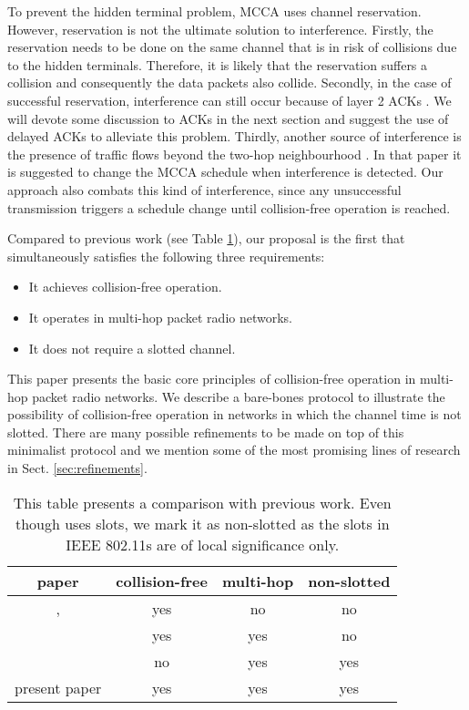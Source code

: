 \documentclass[twocolumn]{svjour3}          \smartqed  \usepackage{graphicx}
\begin{document}
To prevent the hidden terminal problem, MCCA uses channel reservation.
However, reservation is not the ultimate solution to interference.
Firstly, the reservation needs to be done on the same channel that is in risk of collisions due to the hidden terminals.
Therefore, it is likely that the reservation suffers a collision and consequently the data packets also collide.
Secondly, in the case of successful reservation, interference can still occur because of layer 2 ACKs \cite{krasilov2011iem}.
We will devote some discussion to ACKs in the next section and suggest the use of delayed ACKs to alleviate this problem.
Thirdly, another source of interference is the presence of traffic flows beyond the two-hop neighbourhood \cite{cicconetti2008sdr}.
In that paper it is suggested to change the MCCA schedule when interference is detected.
Our approach also combats this kind of interference, since any unsuccessful transmission triggers a schedule change until collision-free operation is reached.

Compared to previous work (see Table \ref{tab:related_work}), our proposal is the first that simultaneously satisfies the following three requirements:
\begin{itemize}
\item It achieves collision-free operation.
\item It operates in multi-hop packet radio networks.
\item It does not require a slotted channel.
\end{itemize}

This paper presents the basic core principles of collision-free operation in multi-hop packet radio networks.
We describe a bare-bones protocol to illustrate the possibility of collision-free operation in networks in which the channel time is not slotted.
There are many possible refinements to be made on top of this minimalist protocol and we mention some of the most promising lines of research in Sect. \ref{sec:refinements}.

\begin{table}[]
\caption{This table presents a comparison with previous work. Even though \cite{hiertz2010wms} uses slots, we mark it as non-slotted as the slots in IEEE 802.11s are of local significance only. }
\label{tab:related_work}
\centering
\begin{tabular}{|c| |c|c|c|}
\hline
  paper & collision-free & multi-hop & non-slotted  \\
\hline
  \cite{barcelo2008lba},\cite{fang2010dlm} & yes & no & no  \\
\hline
  \cite{hui2011epp} & yes & yes & no \\
\hline
  \cite{hiertz2010wms} & no & yes & yes \\
\hline
  present paper & yes & yes & yes \\
\hline
\end{tabular}
\end{table}
\end{document}
